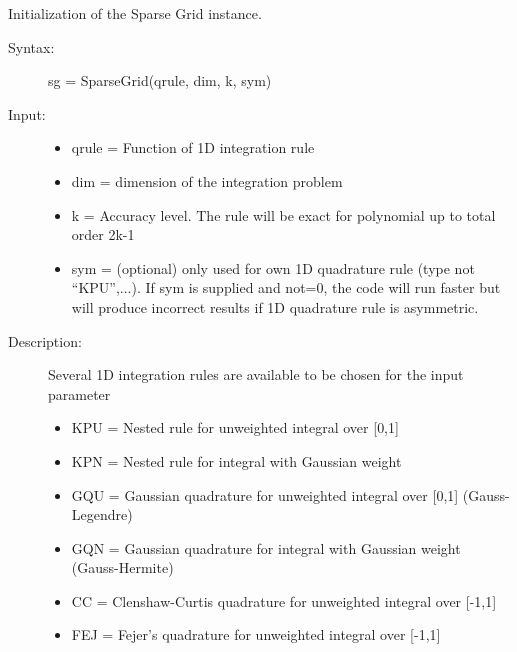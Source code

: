 \documentclass[letterpaper,10pt,english]{sphinxmanual}
\begin{document}
\begin{fulllineitems}
\label{index:SpectralToolbox.SparseGrids.SparseGrid}
Initialization of the Sparse Grid instance.
\begin{description}
\item[{Syntax:}] \leavevmode
sg = SparseGrid(qrule, dim, k, sym)

\item[{Input: }] \leavevmode\begin{itemize}
\item {} 
qrule = Function of 1D integration rule

\item {} 
dim  = dimension of the integration problem

\item {} 
k    = Accuracy level. The rule will be exact for polynomial up to total order 2k-1

\item {} 
sym  = (optional) only used for own 1D quadrature rule (type not ``KPU'',...). If sym is supplied and not=0, the code will run faster but will produce incorrect results if 1D quadrature rule is asymmetric.

\end{itemize}

\item[{Description:}] \leavevmode
Several 1D integration rules are available to be chosen for the  input parameter
\begin{itemize}
\item {} 
KPU = Nested rule for unweighted integral over {[}0,1{]}

\item {} 
KPN = Nested rule for integral with Gaussian weight

\item {} 
GQU = Gaussian quadrature for unweighted integral over {[}0,1{]} (Gauss-Legendre)

\item {} 
GQN = Gaussian quadrature for integral with Gaussian weight (Gauss-Hermite)

\item {} 
CC  = Clenshaw-Curtis quadrature for unweighted integral over {[}-1,1{]}

\item {} 
FEJ = Fejer's quadrature for unweighted integral over {[}-1,1{]}


\end{itemize}
\end{description}
\end{fulllineitems}
\end{document}
